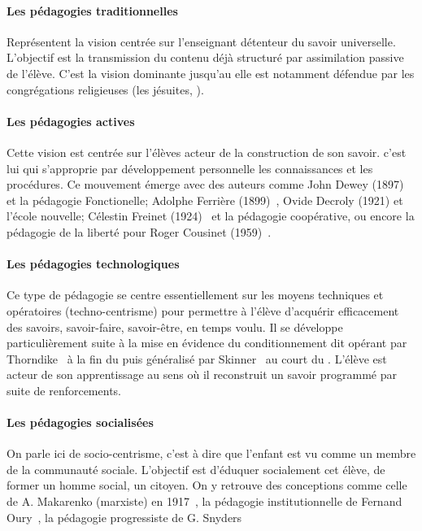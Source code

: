             \paragraph{Les pédagogies traditionnelles}
                Représentent la vision centrée sur l'enseignant détenteur du savoir universelle. L'objectif est la transmission du contenu déjà structuré par assimilation passive de l'élève. C'est la vision dominante jusqu'au  elle est notamment défendue par les congrégations religieuses (les jésuites, \etc).
            \paragraph{Les pédagogies actives} 
                Cette vision est centrée sur l'élèves acteur de la construction de son savoir. c'est lui qui s'approprie par développement personnelle les connaissances et les procédures.
                Ce mouvement émerge avec des auteurs comme John Dewey (1897)~ et la pédagogie Fonctionelle; Adolphe Ferrière (1899)~, Ovide Decroly (1921) et  l'école nouvelle; Célestin Freinet (1924)~ et 
                la pédagogie coopérative, ou encore la pédagogie de la liberté pour Roger Cousinet (1959)~.
            \paragraph{Les pédagogies technologiques}
                Ce type de pédagogie se centre essentiellement sur les moyens techniques et opératoires (techno-centrisme) pour permettre à l'élève d'acquérir efficacement des savoirs, savoir-faire, savoir-être, en temps voulu. Il se développe particulièrement suite à la mise en évidence du conditionnement dit opérant par Thorndike~ à la fin du  puis généralisé par Skinner~ au court du . L'élève est acteur de son apprentissage au sens où il reconstruit un savoir programmé par suite de renforcements. %
            \paragraph{Les pédagogies socialisées}
                On parle ici de socio-centrisme, c'est à dire que l'enfant est vu comme un membre de la communauté sociale. L'objectif est d'éduquer socialement cet élève, de former un homme social, un citoyen. On y retrouve des conceptions comme celle de A. Makarenko (marxiste) en 1917~, la pédagogie institutionnelle de Fernand Oury~, la pédagogie progressiste de G. Snyders~

